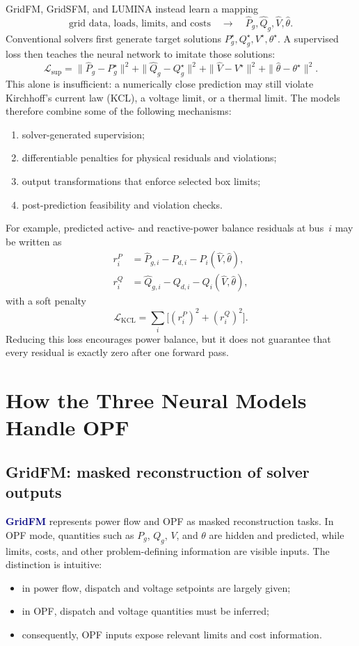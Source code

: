 \documentclass[11pt,a4paper]{article}
\newcommand{\model}[1]{\textcolor{navy}{\textbf{#1}}}
\begin{document}
GridFM, GridSFM, and LUMINA instead learn a mapping
\[
\boxed{\text{grid data, loads, limits, and costs}}
\quad\longrightarrow\quad
\boxed{\widehat P_g,\widehat Q_g,\widehat V,\widehat\theta}.
\]
Conventional solvers first generate target solutions
\(P_g^\star,Q_g^\star,V^\star,\theta^\star\). A supervised loss then teaches the neural network to imitate those solutions:
\[
\mathcal L_{\mathrm{sup}}=
\|\widehat P_g-P_g^\star\|^2+
\|\widehat Q_g-Q_g^\star\|^2+
\|\widehat V-V^\star\|^2+
\|\widehat\theta-\theta^\star\|^2.
\]
This alone is insufficient: a numerically close prediction may still violate Kirchhoff's current law (KCL), a voltage limit, or a thermal limit. The models therefore combine some of the following mechanisms:
\begin{enumerate}
  \item solver-generated supervision;
  \item differentiable penalties for physical residuals and violations;
  \item output transformations that enforce selected box limits;
  \item post-prediction feasibility and violation checks.
\end{enumerate}

For example, predicted active- and reactive-power balance residuals at bus~$i$ may be written as
\begin{align}
r_i^P &= \widehat P_{g,i}-P_{d,i}-P_i(\widehat V,\widehat\theta),\\
r_i^Q &= \widehat Q_{g,i}-Q_{d,i}-Q_i(\widehat V,\widehat\theta),
\end{align}
with a soft penalty
\[
\mathcal L_{\mathrm{KCL}}=\sum_i\bigl[(r_i^P)^2+(r_i^Q)^2\bigr].
\]
Reducing this loss encourages power balance, but it does not guarantee that every residual is exactly zero after one forward pass.

\section{How the Three Neural Models Handle OPF}

\subsection{GridFM: masked reconstruction of solver outputs}

\model{GridFM} represents power flow and OPF as masked reconstruction tasks. In OPF mode, quantities such as $P_g$, $Q_g$, $V$, and $\theta$ are hidden and predicted, while limits, costs, and other problem-defining information are visible inputs. The distinction is intuitive:
\begin{itemize}
  \item in power flow, dispatch and voltage setpoints are largely given;
  \item in OPF, dispatch and voltage quantities must be inferred;
  \item consequently, OPF inputs expose relevant limits and cost information.
\end{itemize}
\end{document}
